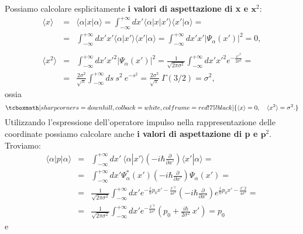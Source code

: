 Possiamo calcolare esplicitamente \textbf{i valori di aspettazione di x e $\mathbf x^2$}:
	\begin{eqnarray}
		\langle x \rangle &=& \langle \alpha | x | \alpha \rangle = \int_{-\infty}^{+\infty} dx' \langle \alpha | x | x' \rangle \langle x' | \alpha \rangle =  \nonumber \\
		&=&  \int_{-\infty}^{+\infty} dx' x' \langle \alpha | x' \rangle \langle x' | \alpha \rangle = \int_{-\infty}^{+\infty} dx' x' |\Psi_\alpha (x')|^2 = 0,\\
		\nonumber \\
		\langle x^2 \rangle &=&  \int_{-\infty}^{+\infty} dx' x'^2 |\Psi_\alpha (x')|^2 = \frac{1}{\sqrt{2 \pi \sigma^2}} \int_{-\infty}^{+\infty} dx' x'^2 e^{- \frac{x'^2}{2 \sigma^2}} =\nonumber  \\
		&=& \frac{2 \sigma^2}{\sqrt{\pi}} \int_{-\infty}^{+\infty} ds ~ s^2 ~e^{-s^2} = \frac{2 \sigma^2}{\sqrt{\pi}} ~ \Gamma(3/2) = \sigma^2,
	\end{eqnarray}
ossia
	\begin{equation}
		\tcboxmath[sharp corners=downhill ,colback=white,colframe=red!75!black]{
			\langle x \rangle = 0, \quad \langle x^2 \rangle = \sigma^2.
			}
	\end{equation}
Utilizzando l'espressione dell'operatore impulso nella rappresentazione delle coordinate possiamo calcolare anche \textbf{i valori di aspettazione di p e $\mathbf p^2$}. Troviamo:
	\begin{eqnarray}
		\langle \alpha | p | \alpha \rangle  &=&  \int_{-\infty}^{+\infty} dx'\ \langle \alpha | x' \rangle \left(-i \hbar \frac{\partial}{\partial x'} \right) \langle x' | \alpha \rangle = \nonumber\\
		&=& \int_{-\infty}^{+\infty} dx' \Psi ^* _\alpha(x') \left(-i \hbar \frac{\partial}{\partial x'} \right) \Psi_\alpha(x') = \nonumber \\
		&=& \frac{1}{\sqrt{2 \pi \sigma^2}} \int_{-\infty}^{+\infty} dx' e^{-\frac{i}{\hbar}p_0 x' - \frac{x^{\prime \,2}}{4 \sigma^2}} \left(-i \hbar \frac{\partial}{\partial x'} \right) e^{\frac{i}{\hbar}p_0 x' - \frac{x{\prime \,2}}{4 \sigma^2}} = \nonumber \\
		&=& \frac{1}{\sqrt{2 \pi \sigma^2}} \int_{-\infty}^{+\infty} dx'  e^{- \frac{x^{\prime \,2}}{2 \sigma^2}} \left(p_0 + \frac{i \hbar}{2 \sigma^2} ~x' \right) = p_0
	\end{eqnarray}
e
